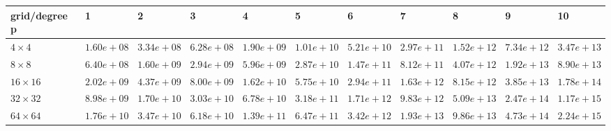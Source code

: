 \begin{tabular}{lllllllllll}
\hline
 grid/degree p   & 1          & 2          & 3          & 4          & 5          & 6          & 7          & 8          & 9          & 10         \\
\hline
 $4 \times 4$    & $1.60e+08$ & $3.34e+08$ & $6.28e+08$ & $1.90e+09$ & $1.01e+10$ & $5.21e+10$ & $2.97e+11$ & $1.52e+12$ & $7.34e+12$ & $3.47e+13$ \\
 $8 \times 8$    & $6.40e+08$ & $1.60e+09$ & $2.94e+09$ & $5.96e+09$ & $2.87e+10$ & $1.47e+11$ & $8.12e+11$ & $4.07e+12$ & $1.92e+13$ & $8.90e+13$ \\
 $16 \times 16$  & $2.02e+09$ & $4.37e+09$ & $8.00e+09$ & $1.62e+10$ & $5.75e+10$ & $2.94e+11$ & $1.63e+12$ & $8.15e+12$ & $3.85e+13$ & $1.78e+14$ \\
 $32 \times 32$  & $8.98e+09$ & $1.70e+10$ & $3.03e+10$ & $6.78e+10$ & $3.18e+11$ & $1.71e+12$ & $9.83e+12$ & $5.09e+13$ & $2.47e+14$ & $1.17e+15$ \\
 $64 \times 64$  & $1.76e+10$ & $3.47e+10$ & $6.18e+10$ & $1.39e+11$ & $6.47e+11$ & $3.42e+12$ & $1.93e+13$ & $9.86e+13$ & $4.73e+14$ & $2.24e+15$ \\
\hline
\end{tabular}